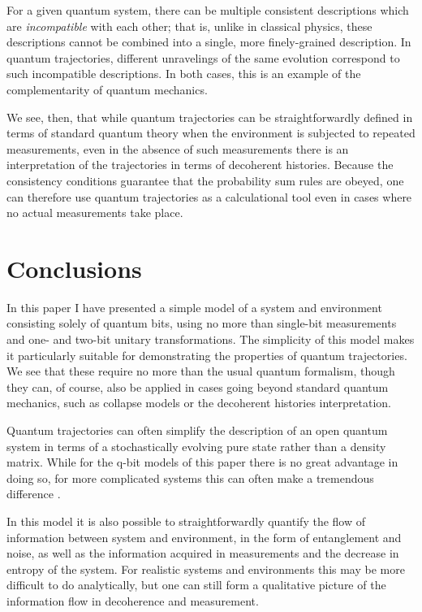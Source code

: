 \documentclass[12pt]{article}
\begin{document}
For a given quantum system, there can be multiple consistent descriptions
which are {\it incompatible} with each other; that is, unlike in classical
physics, these descriptions cannot be combined into a single, more
finely-grained description.  In quantum trajectories, different unravelings
of the same evolution correspond to such incompatible descriptions.
In both cases, this is an example of the complementarity of quantum
mechanics.

We see, then, that while quantum trajectories can be straightforwardly
defined in terms of standard quantum theory when the environment is
subjected to repeated measurements, even in the absence of such measurements
there is an interpretation of the trajectories in terms of decoherent
histories.  Because the consistency conditions guarantee that the
probability sum rules are obeyed, one can therefore use quantum trajectories
as a calculational tool even in cases where no actual measurements
take place.


\section{Conclusions}

In this paper I have presented a simple model of a system and environment
consisting solely of quantum bits, using no more than single-bit
measurements and one- and two-bit unitary transformations.  The
simplicity of this model makes it particularly suitable for demonstrating
the properties of quantum trajectories.  We see that these require no
more than the usual quantum formalism, though they can, of course, also
be applied in cases going beyond standard quantum mechanics, such as
collapse models or the decoherent histories interpretation.

Quantum trajectories can often simplify the description of an open
quantum system in terms of a stochastically evolving pure state rather
than a density matrix.  While for the q-bit models of this paper there
is no great advantage in doing so, for more complicated systems this
can often make a tremendous difference \cite{Schack}.

In this model it is also possible to straightforwardly quantify the
flow of information between system and environment, in the form of
entanglement and noise, as well as the information acquired in measurements
and the decrease in entropy of the system.  For realistic systems
and environments this may be more difficult to do analytically, but one
can still form a qualitative picture of the information flow in
decoherence and measurement.
\end{document}

